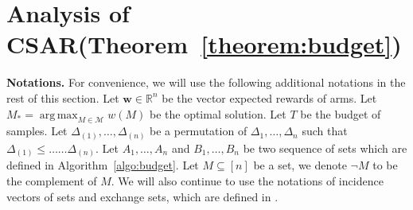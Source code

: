 \documentclass{article}
\newcommand{\junk}[1]{}
\newcommand{\AlgorithmBud}{{\small \textsf{CSAR}}\xspace}
\newcommand{\Problem}{{CPE}\xspace}
\newcommand{\M}{\mathcal M}
\newcommand{\del}{\backslash}
\newcommand{\RR}{\mathbb R}
\DeclareMathOperator*{\argmax}{arg\,max}
\newcommand{\barlog}{\tilde{\log}}
\renewcommand{\vec}[1]{\boldsymbol{#1}}
\begin{document}

\section{Analysis of \AlgorithmBud (Theorem~\ref{theorem:budget})}
\label{section:fixed-budget-proof}

\textbf{Notations.}
For convenience, we will use the following additional notations in the rest of this section.
Let $\vec w \in \RR^n$ be the vector expected rewards of arms.
Let $M_* = \argmax_{M\in \M} w(M)$ be the optimal solution.
Let $T$ be the budget of samples.
Let $\Delta_{(1)},\ldots,\Delta_{(n)}$ be a permutation of $\Delta_1,\ldots,\Delta_n$ such that
$\Delta_{(1)} \le \ldots \ldots \Delta_{(n)}$.
Let $A_1,\ldots,A_n$ and $B_1,\ldots, B_n$ be two sequence of sets which are defined in Algorithm~\ref{algo:budget}.
Let $M\subseteq [n]$ be a set, we denote $\neg M$ to be the complement of $M$.
We will also continue to use the notations of incidence vectors of sets and exchange sets, which are defined in .

\junk{
\begin{lemma}
For each phase $t>0$ and each active arm $e\in [n] \del (A_t \cup B_t)$ of phase $t$, 
the arm $e$ must be pulled for at least $\tilde T_t$ times by Algorithm~X during phases $1,\ldots,t$, where $\tilde T$ is given by
\begin{equation}
\label{eq:define-tilde-t}
\tilde T_t = \left\lceil \frac{T-n}{\barlog(n)(n-t+1)} \right\rceil.
\end{equation}
\label{lemma:fbudget:samples}
\end{lemma}

\begin{proof}
Consider an arbitrary phase $t\in [n]$ and an arbitrary active arm $e\in [n] \del (A_t\cup B_t)$ of phase $t$.
Then, we can compute the number of pulls of arm $e$ as follows
\begin{equation}
\end{equation}
\end{proof}
}
\end{document}
